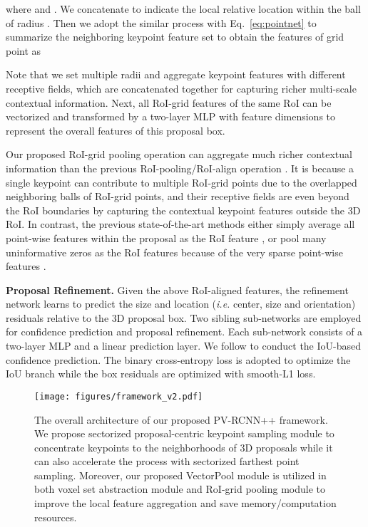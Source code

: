 \documentclass[natbib,twocolumn]{svjour3}          \smartqed  \usepackage{graphicx}
\begin{document}
where  and . We concatenate  to indicate the local relative location within the ball of radius . 
Then we adopt the similar process with Eq.~\eqref{eq:pointnet} to summarize the neighboring keypoint feature set  to obtain the features of grid point  as 


Note that we set multiple radii  and aggregate keypoint features with different receptive fields, which are concatenated together for capturing richer multi-scale contextual information. 
Next, all RoI-grid features  of the same RoI can be vectorized and transformed by a two-layer MLP with  feature dimensions to represent the overall features of this proposal box. 

Our proposed RoI-grid pooling operation can aggregate much richer contextual information than the previous RoI-pooling/RoI-align operation \citep{shi2019pointrcnn,std2019yang,shi2020part}. 
It is because a single keypoint can contribute to multiple RoI-grid points due to the overlapped neighboring balls of RoI-grid points, and their receptive fields are even beyond the RoI boundaries by capturing the contextual keypoint features outside the 3D RoI. In contrast, the previous state-of-the-art methods either simply average all point-wise features within the proposal as the RoI feature \citep{shi2019pointrcnn}, or pool many uninformative zeros as the RoI features because of the very sparse point-wise features \citep{shi2020part,std2019yang}. 


\noindent
\textbf{Proposal Refinement.} 
Given the above RoI-aligned features, the refinement network learns to predict the size and location (\emph{i.e.} center, size and orientation) residuals relative to the 3D proposal box. 
Two sibling sub-networks are employed for confidence prediction and proposal refinement. Each sub-network consists of a two-layer MLP and a linear prediction layer. 
We follow \citep{shi2020part} to conduct the IoU-based confidence prediction.
The binary cross-entropy loss is adopted to optimize the IoU branch while the box residuals are optimized with smooth-L1 loss. 


\begin{figure*}
	\begin{center}	\texttt{[image: figures/framework\_v2.pdf]}
	\end{center}
	\vspace{-2mm}
	\caption{The overall architecture of our proposed PV-RCNN++ framework. We propose sectorized proposal-centric keypoint sampling module to concentrate keypoints to the neighborhoods of 3D proposals while it can also accelerate the process with sectorized farthest point sampling. Moreover, our proposed VectorPool module is utilized in both voxel set abstraction module and RoI-grid pooling module to improve the local feature aggregation and save memory/computation resources.}
	\label{fig:framework_v2}
\end{figure*}
\end{document}
